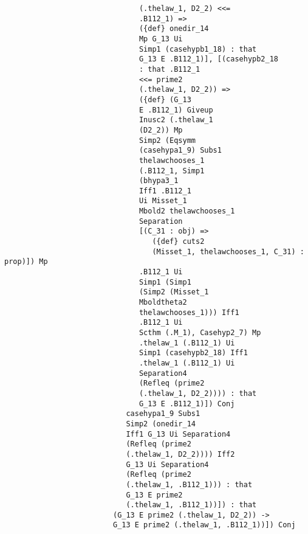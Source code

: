 \documentclass[12pt]{article}
\begin{document}
\begin{verbatim}
                               (.thelaw_1, D2_2) <<= 
                               .B112_1) => 
                               ({def} onedir_14 
                               Mp G_13 Ui 
                               Simp1 (casehypb1_18) : that 
                               G_13 E .B112_1)], [(casehypb2_18 
                               : that .B112_1 
                               <<= prime2 
                               (.thelaw_1, D2_2)) => 
                               ({def} (G_13 
                               E .B112_1) Giveup 
                               Inusc2 (.thelaw_1 
                               (D2_2)) Mp 
                               Simp2 (Eqsymm 
                               (casehypa1_9) Subs1 
                               thelawchooses_1 
                               (.B112_1, Simp1 
                               (bhypa3_1 
                               Iff1 .B112_1 
                               Ui Misset_1 
                               Mbold2 thelawchooses_1 
                               Separation 
                               [(C_31 : obj) => 
                                  ({def} cuts2 
                                  (Misset_1, thelawchooses_1, C_31) : prop)]) Mp 
                               .B112_1 Ui 
                               Simp1 (Simp1 
                               (Simp2 (Misset_1 
                               Mboldtheta2 
                               thelawchooses_1))) Iff1 
                               .B112_1 Ui 
                               Scthm (.M_1), Casehyp2_7) Mp 
                               .thelaw_1 (.B112_1) Ui 
                               Simp1 (casehypb2_18) Iff1 
                               .thelaw_1 (.B112_1) Ui 
                               Separation4 
                               (Refleq (prime2 
                               (.thelaw_1, D2_2)))) : that 
                               G_13 E .B112_1)]) Conj 
                            casehypa1_9 Subs1 
                            Simp2 (onedir_14 
                            Iff1 G_13 Ui Separation4 
                            (Refleq (prime2 
                            (.thelaw_1, D2_2)))) Iff2 
                            G_13 Ui Separation4 
                            (Refleq (prime2 
                            (.thelaw_1, .B112_1))) : that 
                            G_13 E prime2 
                            (.thelaw_1, .B112_1))]) : that 
                         (G_13 E prime2 (.thelaw_1, D2_2)) -> 
                         G_13 E prime2 (.thelaw_1, .B112_1))]) Conj 

\end{verbatim}
\end{document}
